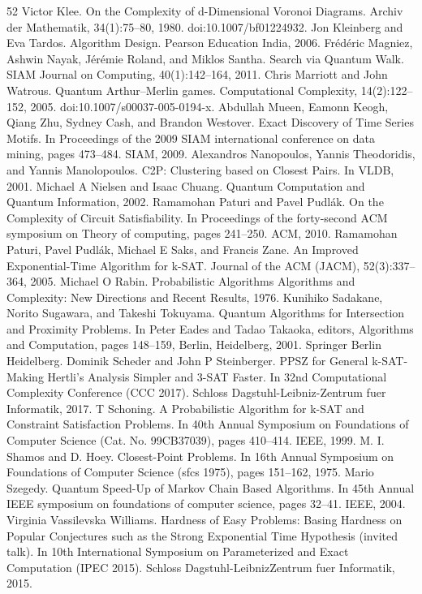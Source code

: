 \documentclass[10pt,a4paper]{article}
\begin{document}
\begin{thebibliography}{52}
 Victor Klee. On the Complexity of d-Dimensional Voronoi Diagrams. Archiv der Mathematik, 34(1):75–80, 1980. doi:10.1007/bf01224932.
 Jon Kleinberg and Eva Tardos. Algorithm Design. Pearson Education India, 2006.
 Frédéric Magniez, Ashwin Nayak, Jérémie Roland, and Miklos Santha. Search via Quantum Walk. SIAM Journal on Computing, 40(1):142–164, 2011.
 Chris Marriott and John Watrous. Quantum Arthur–Merlin games. Computational Complexity, 14(2):122–152, 2005. doi:10.1007/s00037-005-0194-x.
 Abdullah Mueen, Eamonn Keogh, Qiang Zhu, Sydney Cash, and Brandon Westover. Exact Discovery of Time Series Motifs. In Proceedings of the 2009 SIAM international conference on data mining, pages 473–484. SIAM, 2009.
 Alexandros Nanopoulos, Yannis Theodoridis, and Yannis Manolopoulos. C2P: Clustering based on Closest Pairs. In VLDB, 2001.
 Michael A Nielsen and Isaac Chuang. Quantum Computation and Quantum Information, 2002.
 Ramamohan Paturi and Pavel Pudlák. On the Complexity of Circuit Satisfiability. In Proceedings of the forty-second ACM symposium on Theory of computing, pages 241–250. ACM, 2010.
 Ramamohan Paturi, Pavel Pudlák, Michael E Saks, and Francis Zane. An Improved Exponential-Time Algorithm for k-SAT. Journal of the ACM (JACM), 52(3):337–364, 2005.
 Michael O Rabin. Probabilistic Algorithms Algorithms and Complexity: New Directions and Recent Results, 1976.
 Kunihiko Sadakane, Norito Sugawara, and Takeshi Tokuyama. Quantum Algorithms for Intersection and Proximity Problems. In Peter Eades and Tadao Takaoka, editors, Algorithms and Computation, pages 148–159, Berlin, Heidelberg, 2001. Springer Berlin Heidelberg.
 Dominik Scheder and John P Steinberger. PPSZ for General k-SAT-Making Hertli’s Analysis Simpler and 3-SAT Faster. In 32nd Computational Complexity Conference (CCC 2017). Schloss Dagstuhl-Leibniz-Zentrum fuer Informatik, 2017.
 T Schoning. A Probabilistic Algorithm for k-SAT and Constraint Satisfaction Problems. In 40th Annual Symposium on Foundations of Computer Science (Cat. No. 99CB37039), pages 410–414. IEEE, 1999.
 M. I. Shamos and D. Hoey. Closest-Point Problems. In 16th Annual Symposium on Foundations of Computer Science (sfcs 1975), pages 151–162, 1975.
 Mario Szegedy. Quantum Speed-Up of Markov Chain Based Algorithms. In 45th Annual IEEE symposium on foundations of computer science, pages 32–41. IEEE, 2004.
 Virginia Vassilevska Williams. Hardness of Easy Problems: Basing Hardness on Popular Conjectures such as the Strong Exponential Time Hypothesis (invited talk). In 10th International Symposium on Parameterized and Exact Computation (IPEC 2015). Schloss Dagstuhl-LeibnizZentrum fuer Informatik, 2015.

\end{thebibliography}
\end{document}
